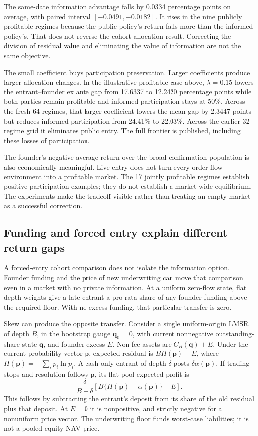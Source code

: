 \documentclass[10pt]{article}
\begin{document}
The same-date information advantage falls by 0.0334 percentage points on average, with paired interval $[-0.0491,-0.0182]$. It rises in the nine publicly profitable regimes because the public policy's return falls more than the informed policy's. That does not reverse the cohort allocation result. Correcting the division of residual value and eliminating the value of information are not the same objective.

The small coefficient buys participation preservation. Larger coefficients produce larger allocation changes. In the illustrative profitable case above, $\lambda=0.15$ lowers the entrant--founder ex ante gap from 17.6337 to 12.2420 percentage points while both parties remain profitable and informed participation stays at 50\%. Across the fresh 64 regimes, that larger coefficient lowers the mean gap by 2.3447 points but reduces informed participation from 24.41\% to 22.03\%. Across the earlier 32-regime grid it eliminates public entry. The full frontier is published, including these losses of participation.

The founder's negative average return over the broad confirmation population is also economically meaningful. Live entry does not turn every order-flow environment into a profitable market. The 17 jointly profitable regimes establish positive-participation examples; they do not establish a market-wide equilibrium. The experiments make the tradeoff visible rather than treating an empty market as a successful correction.

\subsection{Funding and forced entry explain different return gaps}

A forced-entry cohort comparison does not isolate the information option. Founder funding and the price of new underwriting can move that comparison even in a market with no private information. At a uniform zero-flow state, flat depth weights give a late entrant a pro rata share of any founder funding above the required floor. With no excess funding, that particular transfer is zero.

Skew can produce the opposite transfer. Consider a single uniform-origin LMSR of depth $B$, in the bootstrap gauge $\mathbf q_0=0$, with current nonnegative outstanding-share state $\mathbf q$, and founder excess $E$. Non-fee assets are $C_B(\mathbf q)+E$. Under the current probability vector $\mathbf p$, expected residual is $BH(\mathbf p)+E$, where $H(\mathbf p)=-\sum_i p_i\ln p_i$. A cash-only entrant of depth $\delta$ posts $\delta\alpha(\mathbf p)$. If trading stops and resolution follows $\mathbf p$, its flat-pool expected profit is
\[
\frac{\delta}{B+\delta}\left[B\{H(\mathbf p)-\alpha(\mathbf p)\}+E\right].
\]
This follows by subtracting the entrant's deposit from its share of the old residual plus that deposit. At $E=0$ it is nonpositive, and strictly negative for a nonuniform price vector. The underwriting floor funds worst-case liabilities; it is not a pooled-equity NAV price.
\end{document}
